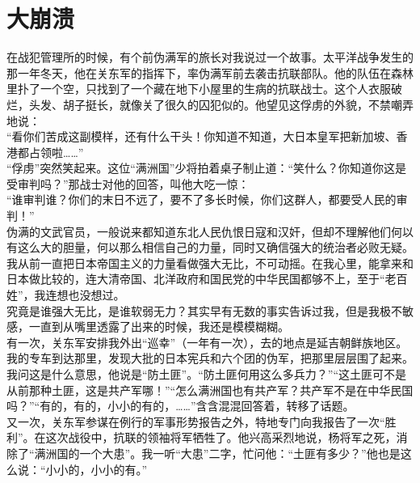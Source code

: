 \fancyhead[RO]{} %
\fancyhead[LE]{} %
\chapter*{大崩溃}
\thispagestyle{empty}
在战犯管理所的时候，有个前伪满军的旅长对我说过一个故事。太平洋战争发生的那一年冬天，他在关东军的指挥下，率伪满军前去袭击抗联部队。他的队伍在森林里扑了一个空，只找到了一个藏在地下小屋里的生病的抗联战士。这个人衣服破烂，头发、胡子挺长，就像关了很久的囚犯似的。他望见这俘虏的外貌，不禁嘲弄地说：\\

“看你们苦成这副模样，还有什么干头！你知道不知道，大日本皇军把新加坡、香港都占领啦……”\\

“俘虏”突然笑起来。这位“满洲国”少将拍着桌子制止道：“笑什么？你知道你这是受审判吗？”那战士对他的回答，叫他大吃一惊：\\

“谁审判谁？你们的末日不远了，要不了多长时候，你们这群人，都要受人民的审判！”\\

伪满的文武官员，一般说来都知道东北人民仇恨日寇和汉奸，但却不理解他们何以有这么大的胆量，何以那么相信自己的力量，同时又确信强大的统治者必败无疑。我从前一直把日本帝国主义的力量看做强大无比，不可动摇。在我心里，能拿来和日本做比较的，连大清帝国、北洋政府和国民党的中华民国都够不上，至于“老百姓”，我连想也没想过。\\

究竟是谁强大无比，是谁软弱无力？其实早有无数的事实告诉过我，但是我极不敏感，一直到从嘴里透露了出来的时候，我还是模模糊糊。\\

有一次，关东军安排我外出“巡幸”（一年有一次），去的地点是延吉朝鲜族地区。我的专车到达那里，发现大批的日本宪兵和六个团的伪军，把那里层层围了起来。我问这是什么意思，他说是“防土匪”。“防土匪何用这么多兵力？”“这土匪可不是从前那种土匪，这是共产军哪！”“怎么满洲国也有共产军？共产军不是在中华民国吗？”“有的，有的，小小的有的，……”含含混混回答着，转移了话题。\\

又一次，关东军参谋在例行的军事形势报告之外，特地专门向我报告了一次“胜利”。在这次战役中，抗联的领袖将军牺牲了。他兴高采烈地说，杨将军之死，消除了“满洲国的一个大患”。我一听“大患”二字，忙问他：“土匪有多少？”他也是这么说：“小小的，小小的有。”\\

